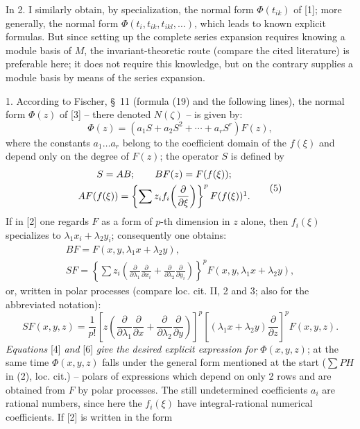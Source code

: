 \documentclass[11pt]{article}
\providecommand{\p}{\partial}
\begin{document}
In 2. I similarly obtain, by specialization, the normal form $\Phi(t_{ik})$ of [1]; more generally, the normal form $\Phi(t_i,t_{ik},t_{ikl},\ldots)$, which leads to known explicit formulas. But since setting up the complete series expansion requires knowing a module basis of $M$, the invariant-theoretic route (compare the cited literature) is preferable here; it does not require this knowledge, but on the contrary supplies a module basis by means of the series expansion.

1. According to Fischer, \S~11 (formula (19) and the following lines), the normal form $\Phi(z)$ of [3] -- there denoted $N(\zeta)$ -- is given by:
\begin{equation}
        \Phi(z)=(a_1S+a_2S^2+\cdots+a_rS^r)F(z),
\tag{4}
\end{equation}
where the constants $a_1\ldots a_r$ belong to the coefficient domain of the $f(\xi)$ and depend only on the degree of $F(z)$; the operator $S$ is defined by
\begin{equation}
\begin{gathered}
        S=AB;\qquad BF(z)=F(f(\xi));\\
        AF(f(\xi))=\left\{\sum z_i f_i\!\left(\frac{\p}{\p\xi}\right)\right\}^{p}F(f(\xi))\footnotemark.
\end{gathered}
\tag{5}
\end{equation}
If in [2] one regards $F$ as a form of $p$-th dimension in $z$ alone, then $f_i(\xi)$ specializes to $\lambda_1x_i+\lambda_2y_i$; consequently one obtains:
\[
\begin{gathered}
        BF=F(x,y,\lambda_1x+\lambda_2y),\\
        SF=\left\{\sum z_i\left(\frac{\p}{\p\lambda_1}\frac{\p}{\p x_i}+
        \frac{\p}{\p\lambda_2}\frac{\p}{\p y_i}\right)\right\}^{p}
        F(x,y,\lambda_1x+\lambda_2y),
\end{gathered}
\]
or, written in polar processes (compare loc. cit. II, 2 and 3; also for the abbreviated notation):
\begin{equation}
        SF(x,y,z)=\frac1{p!}\left[z\left(\frac{\p}{\p\lambda_1}\frac{\p}{\p x}+
        \frac{\p}{\p\lambda_2}\frac{\p}{\p y}\right)\right]^p
        \left[(\lambda_1x+\lambda_2y)\frac{\p}{\p z}\right]^p F(x,y,z).
\tag{6}
\end{equation}
\emph{Equations} [4] \emph{and} [6] \emph{give the desired explicit expression for} $\Phi(x,y,z)$; at the same time $\Phi(x,y,z)$ falls under the general form mentioned at the start ($\sum PH$ in (2), loc. cit.) -- polars of expressions which depend on only 2 rows and are obtained from $F$ by polar processes. The still undetermined coefficients $a_i$ are rational numbers, since here the $f_i(\xi)$ have integral-rational numerical coefficients. If [2] is written in the form
\end{document}
